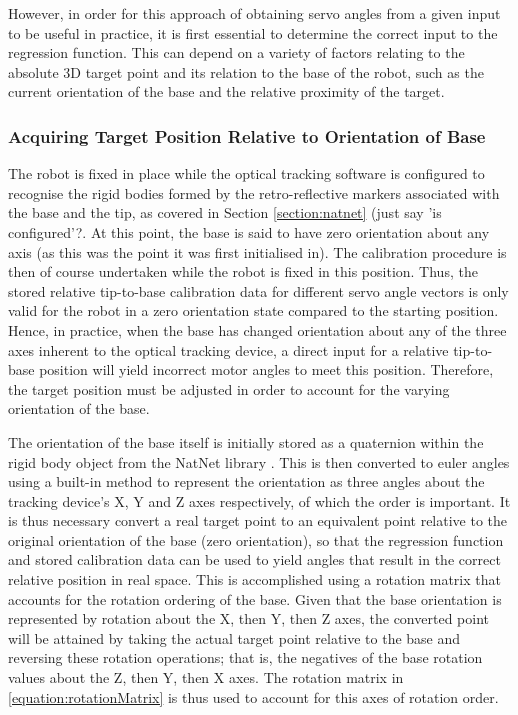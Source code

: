 \documentclass[11pt]{article}
\begin{document}
However, in order for this approach of obtaining servo angles from a given input to be useful in practice, it is first essential to determine the correct input to the regression function. This can depend on a variety of factors relating to the absolute 3D target point and its relation to the base of the robot, such as the current orientation of the base and the relative proximity of the target.

\subsubsection{Acquiring Target Position Relative to Orientation of Base}
The robot is fixed in place while the optical tracking software is configured to recognise the rigid bodies formed by the retro-reflective markers associated with the base and the tip, as covered in Section \ref{section:natnet} (just say 'is configured'?. At this point, the base is said to have zero orientation about any axis (as this was the point it was first initialised in). The calibration procedure is then of course undertaken while the robot is fixed in this position. Thus, the stored relative tip-to-base calibration data for different servo angle vectors is only valid for the robot in a zero orientation state compared to the starting position. Hence, in practice, when the base has changed orientation about any of the three axes inherent to the optical tracking device, a direct input for a relative tip-to-base position will yield incorrect motor angles to meet this position. Therefore, the target position must be adjusted in order to account for the varying orientation of the base.

The orientation of the base itself is initially stored as a quaternion within the rigid body object from the NatNet library \cite{natnet2016}. This is then converted to euler angles using a built-in method to represent the orientation as three angles about the tracking device's X, Y and Z axes respectively, of which the order is important. It is thus necessary convert a real target point to an equivalent point relative to the original orientation of the base (zero orientation), so that the regression function and stored calibration data can be used to yield angles that result in the correct relative position in real space. This is accomplished using a rotation matrix that accounts for the rotation ordering of the base. Given that the base orientation is represented by rotation about the X, then Y, then Z axes, the converted point will be attained by taking the actual target point relative to the base and reversing these rotation operations; that is, the negatives of the base rotation values about the Z, then Y, then X axes. The rotation matrix in \eqref{equation:rotationMatrix} is thus used to account for this axes of rotation order. 
\end{document}
